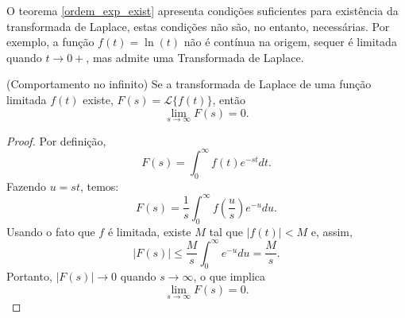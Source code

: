 \begin{obs} O teorema \ref{ordem_exp_exist} apresenta condições suficientes para existência da transformada de Laplace, estas condições não são, no entanto, necessárias. Por exemplo, a função $f(t)=\ln(t)$ não é contínua na origem, sequer é limitada quando $t\to 0+$, mas admite uma Transformada de Laplace.
 \end{obs}
\begin{teo} (Comportamento no infinito) Se a transformada de Laplace de uma função limitada $f(t)$ existe, $F(s)=\mathcal{L}\{f(t)\}$, então
$$
\lim_{s\to\infty}F(s)=0.
$$
\end{teo}
\begin{proof}
 Por definição,
 $$
 F(s)=\int_0^\infty f(t)e^{-st}dt.
 $$
Fazendo $u=st$, temos:
$$
 F(s)=\frac{1}{s}\int_0^\infty f\left(\frac{u}{s}\right)e^{-u}du.
 $$
 Usando o fato que $f$ é limitada, existe $M$ tal que $|f(t)|<M$ e, assim,
$$
| F(s) |\leq \frac{M}{s}\int_0^\infty e^{-u}du = \frac{M}{s}.
 $$ 
 Portanto, $|F(s)|\to 0$ quando $s\to \infty$, o que implica 
 $$
\lim_{s\to\infty}F(s)=0.
$$
\end{proof}
